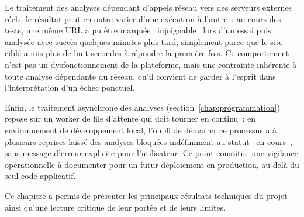 Le traitement des analyses d\'ependant d'appels r\'eseau vers des serveurs
externes r\'eels, le r\'esultat peut en outre varier d'une ex\'ecution \`a
l'autre~: au cours des tests, une m\^eme URL a pu \^etre marqu\'ee \og~injoignable~\fg{}
lors d'un essai puis analys\'ee avec succ\`es quelques minutes plus tard,
simplement parce que le site cibl\'e a mis plus de huit secondes \`a r\'epondre la
premi\`ere fois. Ce comportement n'est pas un dysfonctionnement de la
plateforme, mais une contrainte inh\'erente \`a toute analyse d\'ependante du
r\'eseau, qu'il convient de garder \`a l'esprit dans l'interpr\'etation d'un
\'echec ponctuel.

Enfin, le traitement asynchrone des analyses (section~\ref{chap:programmation})
repose sur un worker de file d'attente qui doit tourner en continu~: en
environnement de d\'eveloppement local, l'oubli de d\'emarrer ce processus a \`a
plusieurs reprises laiss\'e des analyses bloqu\'ees ind\'efiniment au statut
\og~en cours~\fg, sans message d'erreur explicite pour l'utilisateur. Ce point
constitue une vigilance op\'erationnelle \`a documenter pour un futur
d\'eploiement en production, au-del\`a du seul code applicatif.

Ce chapitre a permis de pr\'esenter les principaux r\'esultats techniques du
projet ainsi qu'une lecture critique de leur port\'ee et de leurs limites.
